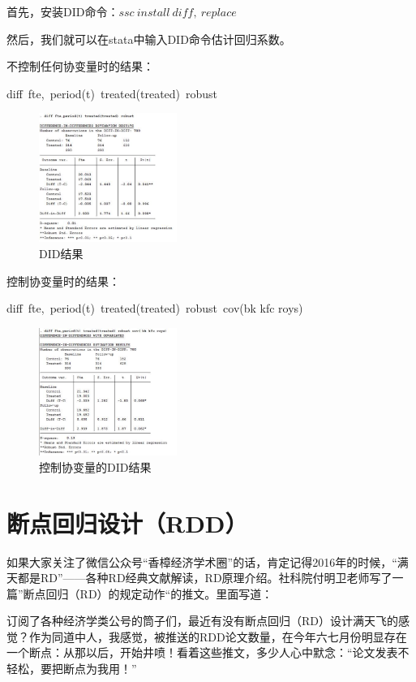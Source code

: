 \documentclass[cn,10pt,math=newtx,citestyle=gb7714-2015,bibstyle=gb7714-2015]{elegantbook}
\begin{document}
	首先，安装DID命令：$ssc~install~diff,~replace$
	
	然后，我们就可以在stata中输入DID命令估计回归系数。
	
	不控制任何协变量时的结果：
	
	diff~fte,~period(t)~treated(treated)~robust
	\begin{figure}[htbp]
		\centering
		\includegraphics[width=0.4\textwidth]{DIDresults.jpg}
		\caption{DID结果}\label{fig:digit}
	\end{figure}
	
	控制协变量时的结果：
	
	diff~fte,~period(t)~treated(treated)~robust~cov(bk kfc roys)
	\begin{figure}[htbp]
		\centering
		\includegraphics[width=0.4\textwidth]{DIDcov.jpg}
		\caption{控制协变量的DID结果}\label{fig:digit}
	\end{figure}
	
	
	
	\section{断点回归设计（RDD）}
	
	如果大家关注了微信公众号“香樟经济学术圈”的话，肯定记得2016年的时候，“满天都是RD”——各种RD经典文献解读，RD原理介绍。社科院付明卫老师写了一篇”断点回归（RD）的规定动作“的推文。里面写道：
	
	订阅了各种经济学类公号的筒子们，最近有没有断点回归（RD）设计满天飞的感觉？作为同道中人，我感觉，被推送的RDD论文数量，在今年六七月份明显存在一个断点：从那以后，开始井喷！看着这些推文，多少人心中默念：“论文发表不轻松，要把断点为我用！”
	
\end{document}
